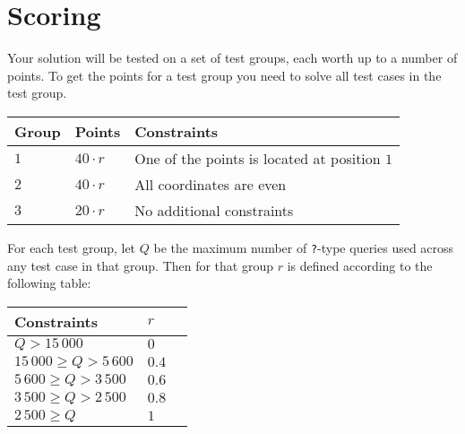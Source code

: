 \section*{Scoring}
Your solution will be tested on a set of test groups, each worth up to a number of points.
To get the points for a test group you need to solve all test cases in the test group.

\noindent
\begin{tabular}{| l | l | l |}
  \hline
  Group & Points       & Constraints \\ \hline
  $1$   & $40 \cdot r$ & One of the points is located at position $1$ \\ \hline
  $2$   & $40 \cdot r$ & All coordinates are even \\ \hline
  $3$   & $20 \cdot r$ & No additional constraints \\ \hline
\end{tabular}

For each test group, let $Q$ be the maximum number of \texttt{?}-type queries used across any test case in that group.
Then for that group $r$ is defined according to the following table:

\noindent
\begin{tabular}{| l | l | l |}
  \hline
  Constraints                & $r$ \\ \hline
  $             Q > 15\,000$ & $0$ \\ \hline
  $ 15\,000 \ge Q > 5\,600$  & $0.4$  \\ \hline
  $  5\,600 \ge Q > 3\,500$  & $0.6$  \\ \hline
  $  3\,500 \ge Q > 2\,500$  & $0.8$  \\ \hline
  $  2\,500 \ge Q$           & $1$  \\ \hline
\end{tabular}
